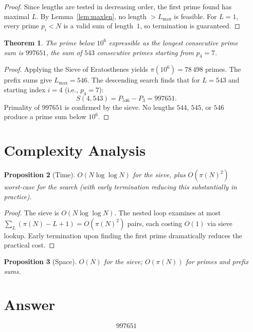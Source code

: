 \documentclass[12pt]{article}
\newtheorem{theorem}{Theorem}
\newtheorem{proposition}[theorem]{Proposition}
\begin{document}
\begin{proof}
Since lengths are tested in decreasing order, the first prime found has maximal $L$. By Lemma~\ref{lem:maxlen}, no length $> L_{\max}$ is feasible. For $L = 1$, every prime $p_i < N$ is a valid sum of length~$1$, so termination is guaranteed.
\end{proof}

\begin{theorem}\label{thm:answer}
The prime below $10^6$ expressible as the longest consecutive prime sum is $997651$, the sum of $543$ consecutive primes starting from $p_4 = 7$.
\end{theorem}

\begin{proof}
Applying the Sieve of Eratosthenes yields $\pi(10^6) = 78\,498$ primes. The prefix sums give $L_{\max} = 546$. The descending search finds that for $L = 543$ and starting index $i = 4$ (i.e., $p_4 = 7$):
\[
S(4, 543) = P_{546} - P_3 = 997651.
\]
Primality of $997651$ is confirmed by the sieve. No lengths $544$, $545$, or $546$ produce a prime sum below $10^6$.
\end{proof}

\section{Complexity Analysis}

\begin{proposition}[Time]
$O(N \log \log N)$ for the sieve, plus $O(\pi(N)^2)$ worst-case for the search (with early termination reducing this substantially in practice).
\end{proposition}

\begin{proof}
The sieve is $O(N \log \log N)$. The nested loop examines at most $\sum_{L} (\pi(N) - L + 1) = O(\pi(N)^2)$ pairs, each costing $O(1)$ via sieve lookup. Early termination upon finding the first prime dramatically reduces the practical cost.
\end{proof}

\begin{proposition}[Space]
$O(N)$ for the sieve; $O(\pi(N))$ for primes and prefix sums.
\end{proposition}

\section{Answer}

\[
\boxed{997651}
\]
\end{document}
